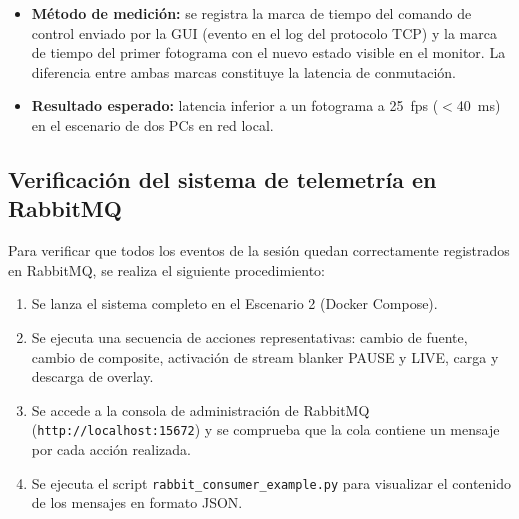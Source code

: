
\begin{itemize}
  \item \textbf{Método de medición:} se registra la marca de tiempo del comando de
        control enviado por la GUI (evento en el log del protocolo TCP) y la marca de
        tiempo del primer fotograma con el nuevo estado visible en el monitor. La
        diferencia entre ambas marcas constituye la latencia de conmutación.
  \item \textbf{Resultado esperado:} latencia inferior a un fotograma a 25~fps
        ($<$40~ms) en el escenario de dos PCs en red local.
\end{itemize}

\subsection{Verificación del sistema de telemetría en RabbitMQ}

Para verificar que todos los eventos de la sesión quedan correctamente registrados en
RabbitMQ, se realiza el siguiente procedimiento:

\begin{enumerate}
  \item Se lanza el sistema completo en el Escenario 2 (Docker Compose).
  \item Se ejecuta una secuencia de acciones representativas: cambio de fuente,
        cambio de composite, activación de stream blanker PAUSE y LIVE, carga y
        descarga de overlay.
  \item Se accede a la consola de administración de RabbitMQ
        (\texttt{http://localhost:15672}) y se comprueba que la cola contiene un
        mensaje por cada acción realizada.
  \item Se ejecuta el script \texttt{rabbit\_consumer\_example.py} para visualizar
        el contenido de los mensajes en formato JSON.
\end{enumerate}


